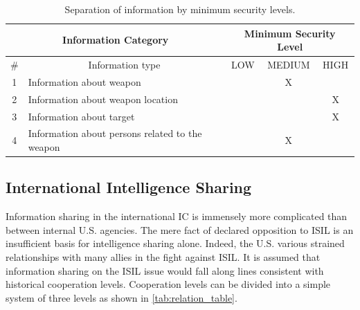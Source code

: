 \documentclass{report}
\begin{document}
\begin{table}[h]
\centering
\begin{tabular}{|c|l|c|c|c|}
\hline
\multicolumn{2}{|c|}{Information Category}           & \multicolumn{3}{c|}{Minimum Security Level}                                                 \\ \hline
\# & \multicolumn{1}{c|}{Information type}           & \cellcolor[HTML]{34FF34}LOW & \cellcolor[HTML]{FCFF2F}MEDIUM & \cellcolor[HTML]{FE0000}HIGH \\ \hline
1  & Information about weapon                        & \cellcolor[HTML]{34FF34}    & \cellcolor[HTML]{FCFF2F}X      & \cellcolor[HTML]{FE0000}     \\ \hline
2  & Information about weapon location               & \cellcolor[HTML]{34FF34}    & \cellcolor[HTML]{FCFF2F}       & \cellcolor[HTML]{FE0000}X    \\ \hline
3  & Information about target                        & \cellcolor[HTML]{34FF34}    & \cellcolor[HTML]{FCFF2F}       & \cellcolor[HTML]{FE0000}X    \\ \hline
4  & Information about persons related to the weapon & \cellcolor[HTML]{34FF34}    & \cellcolor[HTML]{FCFF2F}X      & \cellcolor[HTML]{FE0000}     \\ \hline
\end{tabular}
\caption{Separation of information by minimum security levels.}
\label{tab:separate_sec_level}
\end{table}

\subsection{International Intelligence Sharing}

Information sharing in the international IC is immensely more complicated than between internal U.S. agencies. The mere fact of declared opposition to ISIL is an insufficient basis for intelligence sharing alone.  Indeed, the U.S. various strained relationships with many allies in the fight against ISIL. It is assumed that information sharing on the ISIL issue would fall along lines consistent with historical cooperation levels. Cooperation levels can be divided into a simple system of three levels as shown in \autoref{tab:relation_table}.
\end{document}
